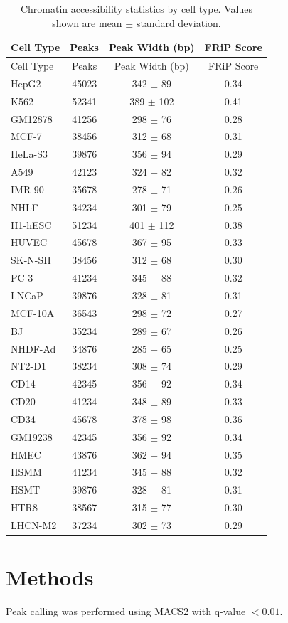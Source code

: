 \documentclass{article}
\begin{document}
\begin{longtable}{lS[table-format=4.0]S[table-format=4.0]S[table-format=3.2]}
\caption{Chromatin accessibility statistics by cell type. Values shown are mean $\pm$ standard deviation.}
\label{tab:accessibility}\\
\toprule
Cell Type & Peaks & Peak Width (bp) & FRiP Score \\
\midrule
\endfirsthead
\toprule
Cell Type & Peaks & Peak Width (bp) & FRiP Score \\
\midrule
\endhead
\midrule
\endlastfoot
HepG2 & 45023 & 342 $\pm$ 89 & 0.34 \\
K562 & 52341 & 389 $\pm$ 102 & 0.41 \\
GM12878 & 41256 & 298 $\pm$ 76 & 0.28 \\
MCF-7 & 38456 & 312 $\pm$ 68 & 0.31 \\
HeLa-S3 & 39876 & 356 $\pm$ 94 & 0.29 \\
A549 & 42123 & 324 $\pm$ 82 & 0.32 \\
IMR-90 & 35678 & 278 $\pm$ 71 & 0.26 \\
NHLF & 34234 & 301 $\pm$ 79 & 0.25 \\
H1-hESC & 51234 & 401 $\pm$ 112 & 0.38 \\
HUVEC & 45678 & 367 $\pm$ 95 & 0.33 \\
SK-N-SH & 38456 & 312 $\pm$ 68 & 0.30 \\
PC-3 & 41234 & 345 $\pm$ 88 & 0.32 \\
LNCaP & 39876 & 328 $\pm$ 81 & 0.31 \\
MCF-10A & 36543 & 298 $\pm$ 72 & 0.27 \\
BJ & 35234 & 289 $\pm$ 67 & 0.26 \\
NHDF-Ad & 34876 & 285 $\pm$ 65 & 0.25 \\
NT2-D1 & 38234 & 308 $\pm$ 74 & 0.29 \\
CD14 & 42345 & 356 $\pm$ 92 & 0.34 \\
CD20 & 41234 & 348 $\pm$ 89 & 0.33 \\
CD34 & 45678 & 378 $\pm$ 98 & 0.36 \\
GM19238 & 42345 & 356 $\pm$ 92 & 0.34 \\
HMEC & 43876 & 362 $\pm$ 94 & 0.35 \\
HSMM & 41234 & 345 $\pm$ 88 & 0.32 \\
HSMT & 39876 & 328 $\pm$ 81 & 0.31 \\
HTR8 & 38567 & 315 $\pm$ 77 & 0.30 \\
LHCN-M2 & 37234 & 302 $\pm$ 73 & 0.29 \\
\end{longtable}

\section{Methods}

Peak calling was performed using MACS2 with q-value $< 0.01$.



\end{document}
